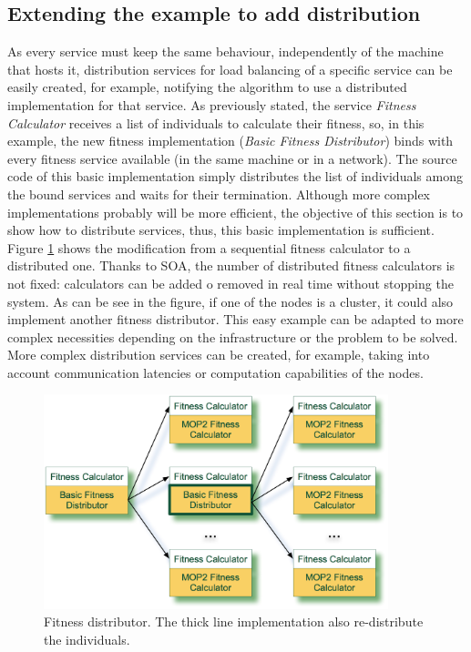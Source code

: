 \subsection{Extending the example to add distribution}
\label{sec:distribution}

As every service must keep the same behaviour, independently of the machine that hosts it, distribution services for load balancing of a specific service can be easily created, for example, notifying the algorithm to use a distributed implementation for that service. As previously stated, the service {\em Fitness Calculator} receives a list of individuals to calculate their fitness, so, in this example, the new fitness implementation ({\em Basic Fitness Distributor}) binds with every fitness service available (in the same machine or in a network). The source code of this basic implementation simply distributes the list of individuals among the bound services and waits for their termination. Although more complex implementations probably will be more efficient, the objective of this section is to show how to distribute services, thus, this basic implementation is sufficient. Figure \ref{FITNESSDISTRIBUTOR} shows the modification from a sequential fitness calculator to a distributed one. Thanks to SOA, the number of distributed fitness calculators is not fixed: calculators can be added o removed in real time without stopping the system. As can be see in the figure, if one of the nodes is a cluster, it could also  implement another fitness distributor. This easy example can be adapted to more complex necessities depending on the infrastructure or the problem to be solved. More complex distribution services can be created, for example, taking into account communication latencies or computation capabilities of the nodes.




\begin{figure}
\centering
\includegraphics[width=10cm]{gfx/soaea/distributor.jpg}
\caption{Fitness distributor. The thick line implementation also re-distribute the individuals.}
\label{FITNESSDISTRIBUTOR}
\end{figure}



